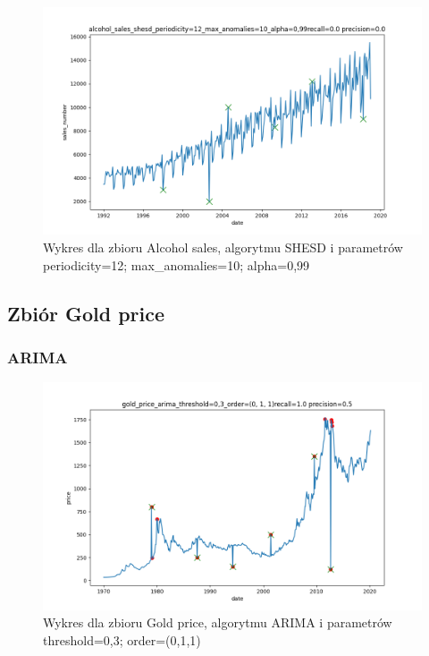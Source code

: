 \documentclass{classrep}
\begin{document}
{{{                \begin{figure}[!htbp]
                    \centering
                    \includegraphics[width=\textwidth]{img/alcohol_sales_shesd_periodicity=12_max_anomalies=10_alpha=0,99-203739.png}
                    \caption
                    {Wykres dla zbioru Alcohol sales, algorytmu SHESD i parametrów periodicity=12; max\_anomalies=10; alpha=0,99}
                    \label{fig:shesh_alcohol}
                \end{figure}
                \FloatBarrier
            }
        }

        \subsection{Zbiór Gold price} {

            \subsubsection{ARIMA} {

                \begin{figure}[!htbp]
                    \centering
                    \includegraphics[width=\textwidth]{img/gold_price_arima_threshold=0,3_order=(0,1,1)-203807.png}
                    \caption
                    {Wykres dla zbioru Gold price, algorytmu ARIMA i parametrów threshold=0,3; order=(0,1,1)}
                    \label{fig:arima_gold}
                \end{figure}
                \FloatBarrier
            }

}}
\end{document}
